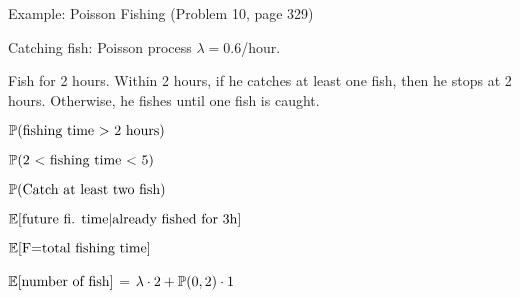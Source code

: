 \begin{frame}{Example: Poisson Fishing (Problem 10, page 329)}

\plitemsep 0.05in
\bci
\item Catching fish: Poisson process $\lambda = 0.6$/hour.
\item Fish for 2 hours. Within 2 hours, if he catches at least one fish, then he stops at 2 hours. Otherwise, he fishes until one fish is caught.
\eci

{}
{
\small
\plitemsep 0.05in
\bce[\bf (Q1)]
\item<2-> $\mathbb{P}( \text{fishing time $>$ 2 hours} )$

\smallskip
{}


\item<5->  $\mathbb{P}( \text{2 $<$ fishing time $<$ 5} )$

\smallskip
{}


\item<8-> $\mathbb{P}( \text{Catch at least two fish} )$

\smallskip
{}


\ece
}
{
\small
\plitemsep 0.05in
\bce[\bf (Q4)]
\item<11-> $\mathbb{E}[ \text{future fi. time}|\text{already fished for 3h} ]$


\item<13->[\bf (Q5)] $\expect{$F=$\text{total fishing time}}$
\item<15->[\bf (Q6)] $\mathbb{E}[ \text{number of fish} ]$ = $\lambda \cdot 2 + \mathbb{P}( 0,2 )\cdot 1$
\ece

}

\end{frame}


